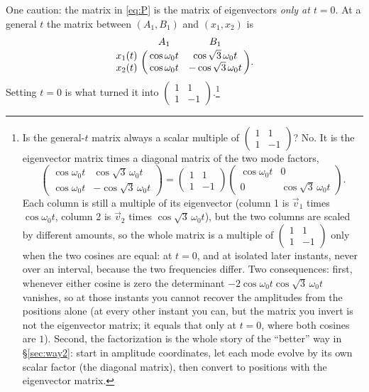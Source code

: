 \documentclass[12pt]{article}
\numberwithin{equation}{section}
\newcommand{\wo}{\omega_0}
\begin{document}
One caution: the matrix in \eqref{eq:P} is the matrix of eigenvectors
\emph{only at $t = 0$}. At a general $t$ the matrix between
$(A_1, B_1)$ and $(x_1, x_2)$ is
\begin{equation*}
  \lmat{A_1}{B_1}{x_1(t)}{x_2(t)}{\cos\wo t}{\cos\sqrt{3}\,\wo t}{\cos\wo t}{-\cos\sqrt{3}\,\wo t}.
\end{equation*}
Setting $t = 0$ is what turned it into $\left(\begin{smallmatrix} 1 & 1
\\ 1 & -1 \end{smallmatrix}\right)$.\footnote{Is the general-$t$ matrix
always a scalar multiple of $\left(\begin{smallmatrix} 1 & 1 \\ 1 & -1
\end{smallmatrix}\right)$? No. It is the eigenvector matrix times a
diagonal matrix of the two mode factors,
\begin{equation*}
  \begin{pmatrix} \cos\wo t & \cos\sqrt{3}\,\wo t \\ \cos\wo t & -\cos\sqrt{3}\,\wo t \end{pmatrix}
  = \begin{pmatrix} 1 & 1 \\ 1 & -1 \end{pmatrix}
  \begin{pmatrix} \cos\wo t & 0 \\ 0 & \cos\sqrt{3}\,\wo t \end{pmatrix}.
\end{equation*}
Each column is still a multiple of its eigenvector (column 1 is $\vec{v}_1$
times $\cos\wo t$, column 2 is $\vec{v}_2$ times $\cos\sqrt{3}\,\wo t$),
but the two columns are scaled by different amounts, so the whole matrix
is a multiple of $\left(\begin{smallmatrix} 1 & 1 \\ 1 & -1
\end{smallmatrix}\right)$ only when the two cosines are equal: at $t = 0$,
and at isolated later instants, never over an interval, because the two
frequencies differ. Two consequences: first, whenever either cosine is
zero the determinant $-2\cos\wo t\cos\sqrt{3}\,\wo t$ vanishes, so at
those instants you cannot recover the amplitudes from the positions alone
(at every other instant you can, but the matrix you invert is not the
eigenvector matrix; it equals that only at $t = 0$, where both cosines are
$1$). Second, the
factorization is the whole story of the ``better'' way in
\S\ref{sec:way2}: start in amplitude coordinates, let each mode evolve by
its own scalar factor (the diagonal matrix), then convert to positions
with the eigenvector matrix.}
\end{document}

